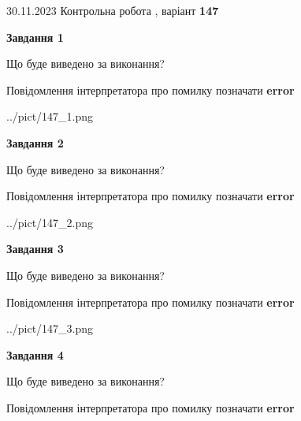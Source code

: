 \documentclass[12pt, ukrainian]{article}
\begin{document}
{{30.11.2023 Контрольна робота , варіант  \No \textbf { 147 }\par}}
{




{\begin {center}\textbf{Завдання 1}\end {center}}\par
Що буде виведено за виконання? \par
Повідомлення інтерпретатора про помилку позначати \textbf{error}

\begin{center}
	{../pict/147_1.png}
\end{center}
\newpage

{\begin {center}\textbf{Завдання 2}\end {center}}\par
Що буде виведено за виконання? \par
Повідомлення інтерпретатора про помилку позначати \textbf{error}

\begin{center}
	{../pict/147_2.png}
\end{center}
\newpage

{\begin {center}\textbf{Завдання 3}\end {center}}\par
Що буде виведено за виконання? \par
Повідомлення інтерпретатора про помилку позначати \textbf{error}

\begin{center}
	{../pict/147_3.png}
\end{center}
\newpage

{\begin {center}\textbf{Завдання 4}\end {center}}\par
Що буде виведено за виконання? \par
Повідомлення інтерпретатора про помилку позначати \textbf{error}

}
\end{document}
